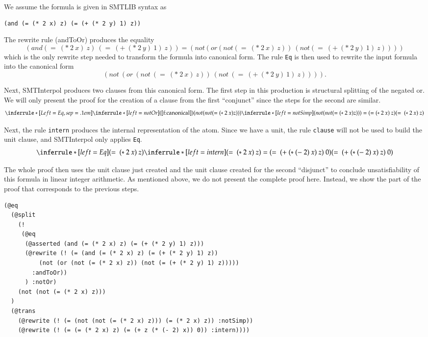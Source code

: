 \documentclass[a4paper]{article}
\newcommand\si{SMTInterpol\xspace}
\begin{document}
We assume the formula is given in SMTLIB syntax as
\begin{verbatim}
(and (= (* 2 x) z) (= (+ (* 2 y) 1) z))
\end{verbatim}

The rewrite rule (andToOr) produces the equality
\[
(and (=\ (*\ 2\ x)\ z)\ (=\ (+\ (*\ 2\ y)\ 1)\ z)) =
(not (or (not (=\ (*\ 2\ x)\ z))\ (not (=\ (+\ (*\ 2\ y)\ 1)\ z))))
\]
which is the only rewrite step needed to transform the formula into canonical
form.  The rule \texttt{Eq} is then used to rewrite the input formula
into the canonical form
\[
(not\ (or\ (not\ (=\ (*\ 2\ x)\ z))\ (not\ (=\ (+\ (*\ 2\ y)\ 1)\ z))))\tag{canonical}\label{f:canonical}.
\]

Next, \si produces two clauses from this canonical form.  The first step in
this production is structural splitting of the negated or.  We will only
present the proof for the creation of a clause from the first ``conjunct''
since the steps for the second are similar.
\[
\inferrule*[Left=Eq,sep=.1em]{
  \inferrule*[left=notOr]{(\ref{f:canonical})}{(not (not (= (*\ 2\ x) z)))}\\
  \inferrule*[left=notSimp]{ }{(not (not (= (*\ 2\ x) z))) =
    (= (*\ 2\ x)\ z)}}
           {(=\ (*\ 2\ x)\ z)}
\]

Next, the rule \texttt{intern} produces the internal representation of the
atom.  Since we have a unit, the rule \texttt{clause} will not be used to
build the unit clause, and \si only applies \texttt{Eq}.
\[
\inferrule*[left=Eq]{(=\ (*\ 2\ x)\ z) \\
  \inferrule*[left=intern]{ }{(=\ (*\ 2\ x)\ z) = (=\ (+\ (*\ (-\ 2)\ x)\ z)\
    0)}}
           {(=\ (+\ (*\ (-\ 2)\ x)\ z)\ 0)}
\]

The whole proof then uses the unit clause just created and the unit clause
created for the second ``disjunct'' to conclude unsatisfiability of this
formula in linear integer arithmetic.  As mentioned above, we do not present
the complete proof here.  Instead, we show the part of the proof that
corresponds to the previous steps.
\begin{verbatim}
(@eq
  (@split
    (!
     (@eq
      (@asserted (and (= (* 2 x) z) (= (+ (* 2 y) 1) z)))
      (@rewrite (! (= (and (= (* 2 x) z) (= (+ (* 2 y) 1) z))
          (not (or (not (= (* 2 x) z)) (not (= (+ (* 2 y) 1) z)))))
        :andToOr))
      ) :notOr)
    (not (not (= (* 2 x) z)))
  )
  (@trans
    (@rewrite (! (= (not (not (= (* 2 x) z))) (= (* 2 x) z)) :notSimp))
    (@rewrite (! (= (= (* 2 x) z) (= (+ z (* (- 2) x)) 0)) :intern))))
\end{verbatim}
\end{document}
